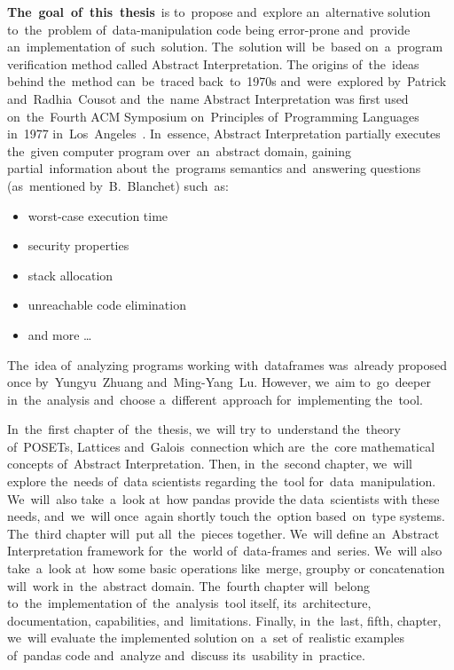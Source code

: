 \textbf{The~goal~of~this~thesis}~is to~propose and~explore an~alternative solution to~the~problem of~data-manipulation
code being error-prone and~provide an~implementation of~such~solution.
The~solution will~be~based on~a~program verification method called Abstract Interpretation.
The origins of~the~ideas behind the~method can~be~traced back~to~1970s and~were~explored by~Patrick and~Radhia~Cousot
and~the~name Abstract Interpretation was first used on~the~Fourth ACM
Symposium on~Principles of~Programming Languages in~1977 in~Los~Angeles~\cite{Cousot:1977:AI}.
In~essence, Abstract Interpretation partially executes the~given computer program over~an~abstract domain, gaining
partial~information about the~programs semantics and~answering questions (as~mentioned
by~B.~Blanchet\cite{Blanchet:2002:AI}) such~as:
\begin{itemize}
    \item worst-case execution time
    \item security properties
    \item stack allocation
    \item unreachable code elimination
    \item and more \ldots
\end{itemize}

The~idea of~analyzing programs working with~dataframes was~already proposed once by~Yungyu~Zhuang
and~Ming-Yang~Lu\cite{Zhuang:2022:TypeChecking}.
However, we~aim to~go~deeper in~the~analysis and~choose a~different~approach for~implementing the~tool.

In~the~first chapter of~the~thesis, we~will try to~understand the~theory of~POSETs, Lattices and~Galois~connection which
are~the~core mathematical concepts of~Abstract Interpretation.
Then, in~the~second chapter, we~will explore the~needs of~data scientists regarding the~tool for~data~manipulation.
We~will~also take~a~look at~how pandas provide the data~scientists with these needs, and~we~will once~again shortly touch
the~option based~on~type systems.
The~third chapter will~put all~the~pieces together.
We~will define an~Abstract Interpretation framework for~the~world of~data-frames and~series.
We~will also take~a~look at~how some basic operations like~merge, groupby or concatenation will~work in~the~abstract domain.
The~fourth chapter will~belong to~the~implementation of~the~analysis~tool itself, its~architecture, documentation,
capabilities, and~limitations.
Finally, in~the~last, fifth, chapter, we~will evaluate the implemented solution on~a~set of~realistic examples of~pandas
code and~analyze and~discuss its~usability in~practice.